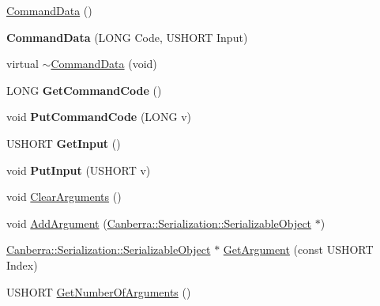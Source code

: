 \begin{DoxyCompactItemize}
\item 
\hyperlink{class_canberra_1_1_data_types_1_1_application_1_1_command_data_a941aae1b371ee382c9f7fe225c534f95_a941aae1b371ee382c9f7fe225c534f95}{Command\+Data} ()
\item 
\mbox{\label{class_canberra_1_1_data_types_1_1_application_1_1_command_data_a29854438cc5d8c60594f75272787e5af}} 
{\bfseries Command\+Data} (L\+O\+NG Code, U\+S\+H\+O\+RT Input)
\item 
virtual \hyperlink{class_canberra_1_1_data_types_1_1_application_1_1_command_data_ae25012d2eda50e7767d5a25a994da4a6_ae25012d2eda50e7767d5a25a994da4a6}{$\sim$\+Command\+Data} (void)
\item 
\mbox{\label{class_canberra_1_1_data_types_1_1_application_1_1_command_data_aacae3900754fef4bf0f3d992fe4fcb87}} 
L\+O\+NG {\bfseries Get\+Command\+Code} ()
\item 
\mbox{\label{class_canberra_1_1_data_types_1_1_application_1_1_command_data_a8401e70499b6f818b517bbb71bf6c1e4}} 
void {\bfseries Put\+Command\+Code} (L\+O\+NG v)
\item 
\mbox{\label{class_canberra_1_1_data_types_1_1_application_1_1_command_data_abebc4c72192d890fd84de7dbc9e975d5}} 
U\+S\+H\+O\+RT {\bfseries Get\+Input} ()
\item 
\mbox{\label{class_canberra_1_1_data_types_1_1_application_1_1_command_data_a3a94599635b69dcca881d9dea66d7e10}} 
void {\bfseries Put\+Input} (U\+S\+H\+O\+RT v)
\item 
void \hyperlink{class_canberra_1_1_data_types_1_1_application_1_1_command_data_ae493f2d17249b2d2d33136cf60aad38c_ae493f2d17249b2d2d33136cf60aad38c}{Clear\+Arguments} ()
\item 
void \hyperlink{class_canberra_1_1_data_types_1_1_application_1_1_command_data_afeb9d2d16aafbfef549d7974242425cc_afeb9d2d16aafbfef549d7974242425cc}{Add\+Argument} (\hyperlink{class_canberra_1_1_serialization_1_1_serializable_object}{Canberra\+::\+Serialization\+::\+Serializable\+Object} $\ast$)
\item 
\hyperlink{class_canberra_1_1_serialization_1_1_serializable_object}{Canberra\+::\+Serialization\+::\+Serializable\+Object} $\ast$ \hyperlink{class_canberra_1_1_data_types_1_1_application_1_1_command_data_a09b4c39d51d4f1e2ba1be53239787242_a09b4c39d51d4f1e2ba1be53239787242}{Get\+Argument} (const U\+S\+H\+O\+RT Index)
\item 
U\+S\+H\+O\+RT \hyperlink{class_canberra_1_1_data_types_1_1_application_1_1_command_data_ae3bf97c25298153e47ff6518e75b83bd_ae3bf97c25298153e47ff6518e75b83bd}{Get\+Number\+Of\+Arguments} ()
\end{DoxyCompactItemize}
